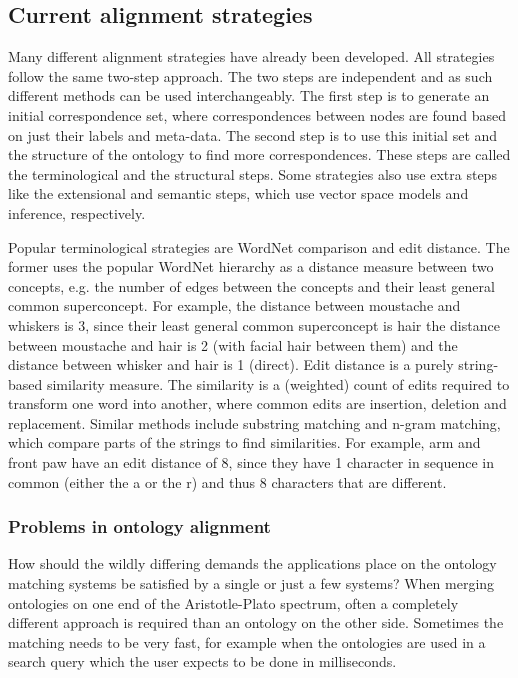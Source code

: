 \documentclass{article}
\begin{document}
 \subsection{Current alignment strategies} \label{strategies}
 Many different alignment strategies have already been developed. All strategies follow the same two-step approach. The two steps are independent and as such different methods can be used interchangeably. The first step is to generate an initial correspondence set, where correspondences between nodes are found based on just their labels and meta-data. The second step is to use this initial set and the structure of the ontology to find more correspondences. These steps are called the terminological and the structural steps. Some strategies also use extra steps like the extensional and semantic steps, which use vector space models and inference, respectively\cite{future}.
 
 Popular terminological strategies are WordNet comparison and edit distance. The former uses the popular WordNet hierarchy as a distance measure between two concepts, e.g. the number of edges between the concepts and their least general common superconcept\cite{lin2008}.
 For example, the distance between moustache and whiskers is 3, since their least general common superconcept is hair the distance between moustache and hair is 2 (with facial hair between them) and the distance between whisker and hair is 1 (direct).
 Edit distance is a purely string-based similarity measure. The similarity is a (weighted) count of edits required to transform one word into another, where common edits are insertion, deletion and replacement. Similar methods include substring matching and n-gram matching, which compare parts of the strings to find similarities\cite{singh2014, levenshtein}.
 For example, arm and front paw have an edit distance of 8, since they have 1 character in sequence in common (either the a or the r) and thus 8 characters that are different.
 \subsubsection{Problems in ontology alignment}
 How should the wildly differing demands the applications place on the ontology matching systems be satisfied by a single or just a few systems? When merging ontologies on one end of the Aristotle-Plato spectrum, often a completely different approach is required than an ontology on the other side. Sometimes the matching needs to be very fast, for example when the ontologies are used in a search query which the user expects to be done in milliseconds.
 
\end{document}
